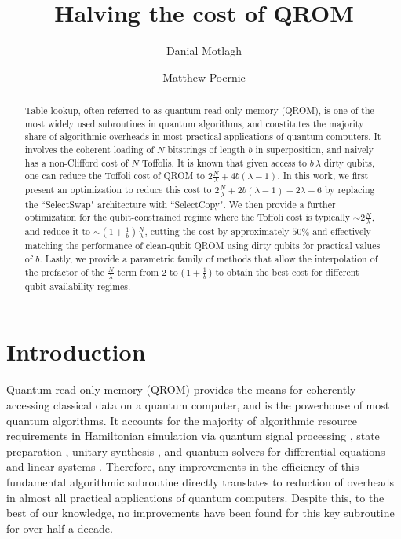 \documentclass[a4paper, amsfonts, amssymb, amsmath, reprint, showkeys, twoside,superscriptaddress, onecolumn, nofootinbib]{revtex4-2}
\begin{document}
\author{Danial Motlagh}
\author{Matthew Pocrnic}
\begin{abstract}
    Table lookup, often referred to as quantum read only memory (QROM), is one of the most widely used subroutines in quantum algorithms, and constitutes the majority share of algorithmic overheads in most practical applications of quantum computers. It involves the coherent loading of $N$ bitstrings of length $b$ in superposition, and naively has a non-Clifford cost of $N$ Toffolis. It is known that given access to $b\, \lambda$ dirty qubits, one can reduce the Toffoli cost of QROM to $2\frac{N}{\lambda} + 4b(\lambda - 1)$. In this work, we first present an optimization to reduce this cost to $2\frac{N}{\lambda} + 2b(\lambda - 1) + 2\lambda-6$ by replacing the ``SelectSwap" architecture with ``SelectCopy". We then provide a further optimization for the qubit-constrained regime where the Toffoli cost is typically $\sim 2\frac{N}{\lambda}$, and reduce it to $\sim (1+\frac{1}{b})\frac{N}{\lambda}$, cutting the cost by approximately $50\%$ and effectively matching the performance of clean-qubit QROM using dirty qubits for practical values of $b$. Lastly, we provide a parametric family of methods that allow the interpolation of the prefactor of the $\frac{N}{\lambda} $ term from $2$ to ($\, 1+\frac{1}{b}\,$) to obtain the best cost for different qubit availability regimes.
\end{abstract}
\title{Halving the cost of QROM}
\maketitle

\section{Introduction}
Quantum read only memory (QROM) provides the means for coherently accessing classical data on a quantum computer, and is the powerhouse of most quantum algorithms. It accounts for the majority of algorithmic resource requirements in Hamiltonian simulation \cite{berry2019qubitization,von2021quantum, lee2021even} via quantum signal processing \cite{low2017optimal,low2019hamiltonian, motlagh2024generalized, berry2024doubling}, state preparation \cite{babbush2018encoding, fomichev2024initial, rupprecht2026sparse}, unitary synthesis \cite{low2024trading, alonso2025quantum, kottmann2026parameter}, and quantum solvers for differential equations \cite{jennings2024cost, pocrnic2025constant, penuel2024detailed} and linear systems \cite{an2022quantum, dalzell2024shortcut, jennings2025randomized}. Therefore, any improvements in the efficiency of this fundamental algorithmic subroutine directly translates to reduction of overheads in almost all practical applications of quantum computers. Despite this, to the best of our knowledge, no improvements have been found for this key subroutine for over half a decade. \\
\end{document}
